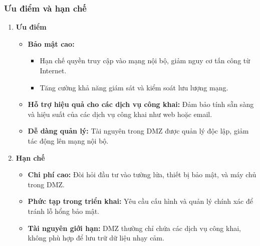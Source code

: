 \documentclass[13pt]{article}
\begin{document}
\subsubsection{Ưu điểm và hạn chế}
\begin{enumerate}
    \item \textbf{Ưu điểm}
    \begin{itemize}
        \item \textbf{Bảo mật cao:}
        \begin{itemize}
            \item Hạn chế quyền truy cập vào mạng nội bộ, giảm nguy cơ tấn công từ Internet.
            \item Tăng cường khả năng giám sát và kiểm soát lưu lượng mạng.
        \end{itemize}
        \item \textbf{Hỗ trợ hiệu quả cho các dịch vụ công khai: }Đảm bảo tính sẵn sàng và hiệu suất của các dịch vụ công khai như web hoặc email.
        \item \textbf{Dễ dàng quản lý: }Tài nguyên trong DMZ được quản lý độc lập, giảm tác động lên mạng nội bộ.
    \end{itemize}
    
    \item \textbf{Hạn chế}
    \begin{itemize}
        \item \textbf{Chi phí cao: }Đòi hỏi đầu tư vào tường lửa, thiết bị bảo mật, và máy chủ trong DMZ.
        \item \textbf{Phức tạp trong triển khai: }Yêu cầu cấu hình và quản lý chính xác để tránh lỗ hổng bảo mật.
        \item \textbf{Tài nguyên giới hạn: }DMZ thường chỉ chứa các dịch vụ công khai, không phù hợp để lưu trữ dữ liệu nhạy cảm.
    \end{itemize}
\end{enumerate}
\end{document}
